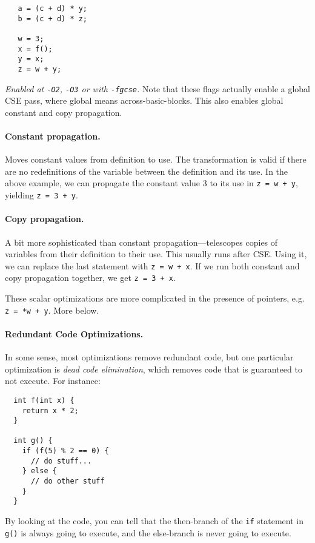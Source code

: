 \begin{verbatim}
   a = (c + d) * y;
   b = (c + d) * z;   

   w = 3;
   x = f();
   y = x;
   z = w + y;

\end{verbatim}


\noindent \emph{Enabled at {\tt -O2}, {\tt -O3} or with {\tt -fgcse}.} Note that
these flags actually enable a global CSE pass, where global means across-basic-blocks.
This also enables global constant and copy propagation.

\paragraph{Constant propagation.} Moves constant values from definition to
use. The transformation is valid if there are no redefinitions of the
variable between the definition and its use. In the above example, 
we can propagate the constant value 3 to its use in {\tt z = w + y},
yielding {\tt z = 3 + y}.

\paragraph{Copy propagation.} A bit more sophisticated than constant
propagation---telescopes copies of variables from their definition to
their use. This usually runs after CSE. Using it, we can replace the
last statement with {\tt z = w + x}. If we run both constant and copy
propagation together, we get {\tt z = 3 + x}.

These scalar optimizations are more complicated in the presence 
of pointers, e.g. {\tt z = *w + y}. More below.


\paragraph{Redundant Code Optimizations.} In some sense, most optimizations
remove redundant code, but one particular optimization is \emph{dead code
elimination}, which removes code that is guaranteed to not execute.
For instance:

{\scriptsize
\begin{verbatim}
  int f(int x) {
    return x * 2;
  }

  int g() {
    if (f(5) % 2 == 0) {
      // do stuff...
    } else {
      // do other stuff
    }
  }
\end{verbatim}
}
By looking at the code, you can tell that the then-branch of the 
{\tt if} statement in {\tt g()} is always going to execute, and the
else-branch is never going to execute.

